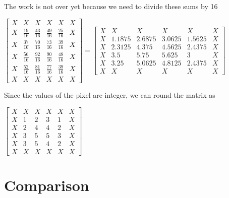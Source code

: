 	  	The work is not over yet because we need to divide these sums by 16\\
	  	\begin{center}
	  	$	\begin{bmatrix}
  			X & X & X & X &X&X\\
  			X & \frac{19}{16} & \frac{43}{16} & \frac{49}{16} & \frac{25}{16} & X\\
  			X & \frac{37}{16} &\frac{70}{16} & \frac{73}{16} & \frac{39}{16} & X   	\\
  			X&\frac{56}{16} & \frac{92}{16} & \frac{90 }{16}& \frac{48}{16}& X\\
  			X&\frac{52}{16}&\frac{81}{16}&\frac{77}{16}&\frac{39}{16}&X\\
  			X & X & X & X &X&X
	  		\end{bmatrix}=	\begin{bmatrix}
	  		X & X & X & X &X&X\\
	  		X & 1.1875 & 2.6875 & 3.0625 & 1.5625 & X\\
	  		X & 2.3125 &4.375 & 4.5625 & 2.4375 & X   	\\
	  		X&3.5 & 5.75 & 5.625& 3& X\\
	  		X&3.25&5.0625&4.8125&2.4375&X\\
	  		X & X & X & X &X&X
	  		\end{bmatrix}$
	  	\end{center}\bigskip
	  	Since the values of the pixel are integer, we can round the matrix as\\
	  	\begin{center}
	  		$	\begin{bmatrix}
	  		X & X & X & X &X&X\\
	  		X & 1 & 2 & 3 & 1 & X\\
	  		X & 2 &4 & 4 & 2 & X   	\\
	  		X&3 & 5 & 5& 3& X\\
	  		X&3&5&4&2&X\\
	  		X & X & X & X &X&X
	  		\end{bmatrix}$
	  		\end{center}
	  	
	  \section{Comparison}
